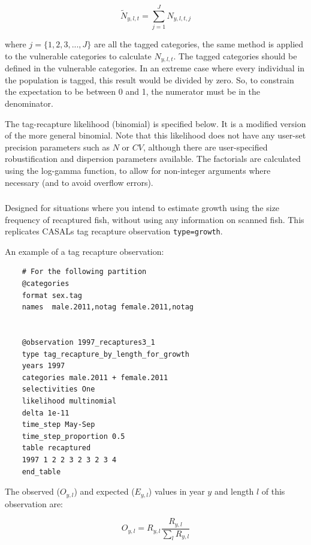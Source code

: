 \begin{equation}
	\tilde{N}_{y,l,t} = \sum_{j = 1}^{J} N_{y,l,t,j}
\end{equation}

where $j = \{1,2,3,...,J\}$  are all the tagged categories, the same method is applied to the vulnerable categories to calculate $N_{y,l,t}$. The tagged categories should be defined in the vulnerable categories. In an extreme case where every individual in the population is tagged, this result would be divided by zero. So, to constrain the expectation to be between 0 and 1, the numerator must be in the denominator.

The tag-recapture likelihood (binomial) is specified below. It is a modified version of the more general binomial. Note that this likelihood does not have any user-set precision parameters such as $N$ or $CV$, although there are user-specified robustification and dispersion parameters available. The factorials are calculated using the log-gamma function, to allow for non-integer arguments where necessary (and to avoid overflow errors).

\subsubsection{\label{sec:Observation-TagRecaptureByLengthForGrowth}}

Designed for situations where you intend to estimate growth using the size frequency of recaptured fish, without using any information on scanned fish. This replicates CASALs tag recapture observation \texttt{type=growth}. 
 
An example of a tag recapture observation:

{\small{\begin{verbatim}
	# For the following partition
	@categories
	format sex.tag
	names  male.2011,notag female.2011,notag
	
	
	@observation 1997_recaptures3_1
	type tag_recapture_by_length_for_growth
	years 1997
	categories male.2011 + female.2011
	selectivities One
	likelihood multinomial
	delta 1e-11
	time_step May-Sep
	time_step_proportion 0.5
	table recaptured
	1997 1 2 2 3 2 3 2 3 4
	end_table
\end{verbatim}}}

The observed ($O_{y,l}$) and expected ($E_{y,l}$) values in year $y$ and length $l$ of this observation are:

\begin{equation}
	O_{y,l} = R_{y,l} \frac{R_{y,l}}{\sum_l R_{y,l}}
\end{equation}

